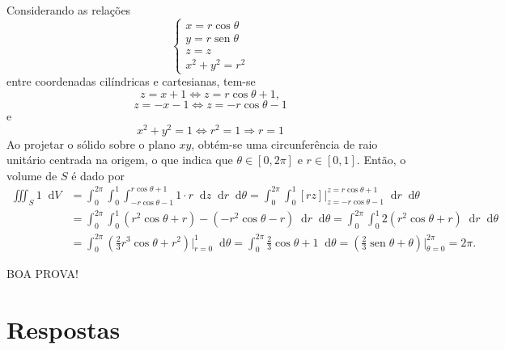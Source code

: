 \documentclass[12pt,a4paper]{article}
\newcommand*\diff{\mathop{}\!\mathrm{d}}
\newcommand*\sen{\operatorname{sen}}
\begin{document}
\begin{ExerciseList}
Considerando as relações
\[
\begin{cases}
  x = r \cos \theta\\
  y = r \sen \theta\\
  z = z\\
  x^2 + y^2 = r^2
\end{cases}
\]
entre coordenadas cilíndricas e cartesianas, tem-se
\[
z = x + 1
\Leftrightarrow
z = r \cos \theta + 1,
\]
\[
z = -x - 1
\Leftrightarrow
z = -r \cos \theta - 1
\]
e
\[
x^2 + y^2 = 1
\Leftrightarrow
r^2 = 1
\Rightarrow
r = 1
\]
Ao projetar o sólido sobre o plano $xy$, obtém-se uma circunferência de raio unitário centrada na origem, o que indica que $\theta\in[0, 2\pi]$ e $r\in[0, 1]$. Então, o volume de $S$ é dado por
\begin{align*}
  \iiint_{S} 1 \diff{V}
  & = \int_0^{2\pi} \int_0^1 \int_{-r \cos \theta - 1}^{r \cos \theta + 1} 1 \cdot r \diff{z}\diff{r}\diff{\theta}
    = \int_0^{2\pi} \int_0^1 [r z] \bigg|_{z = -r \cos \theta - 1}^{z = r \cos \theta + 1} \diff{r}\diff{\theta}\\
  & = \int_0^{2\pi} \int_0^1 (r^2 \cos \theta + r)-(-r^2 \cos \theta - r) \diff{r}\diff{\theta}
    = \int_0^{2\pi} \int_0^1 2(r^2 \cos \theta + r) \diff{r}\diff{\theta}\\
  & = \int_0^{2\pi} \left(\frac{2}{3}r^3 \cos \theta + r^2\right)\bigg|_{r=0}^1 \diff{\theta}
    = \int_0^{2\pi} \frac{2}{3} \cos \theta + 1 \diff{\theta}
    = \left(\frac{2}{3} \sen \theta + \theta \right) \bigg|_{\theta=0}^{2\pi}
    = 2 \pi.
\end{align*}
\end{ExerciseList}

\begin{center}
BOA PROVA!
\end{center}

\newpage
\restoregeometry
\section*{Respostas}
\shipoutAnswer
\end{document}
